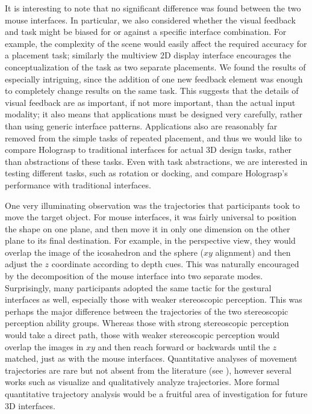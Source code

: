 \documentclass[pageno]{jpaper}
\begin{document}
It is interesting to note that no significant difference was found between the two mouse interfaces. In particular, we also
considered whether the visual feedback and task might be biased for or against a specific interface combination. For example, the
complexity of the scene would easily affect the required accuracy for a placement task; similarly the multiview 2D display interface
encourages the conceptualization of the task as two separate placements. We found the results of \cite{study2} especially intriguing,
since the addition of one new feedback element was enough to completely change results on the same task. This suggests that the details
of visual feedback are as important, if not more important, than the actual input modality; it also means that applications must be
designed very carefully, rather than using generic interface patterns. Applications also are reasonably far removed from the simple tasks
of repeated placement, and thus we would like to compare Holograsp to traditional interfaces for actual 3D design tasks, rather than abstractions
of these tasks. Even with task abstractions, we are interested in testing different tasks, such as rotation or docking, and compare Holograsp's
performance with traditional interfaces.

One very illuminating observation was the trajectories that participants took to move the target object.
For mouse interfaces, it was fairly universal to position the shape on one plane, and then move it in only one dimension on the other
plane to its final destination. For example, in the perspective view, they would overlap the image of the icosahedron and the sphere ($xy$
alignment) and then adjust the $z$ coordinate according to depth cues. This was naturally encouraged by the decomposition of the mouse interface into two separate
modes. Surprisingly, many participants adopted the same tactic for the gestural interfaces as well, especially those with weaker stereoscopic
perception. This was perhaps the major difference between the trajectories of the two stereoscopic perception ability groups. 
Whereas those with strong stereoscopic perception would take a direct path, those with
weaker stereoscopic perception would overlap the images in $xy$ and then reach forward or backwards until the $z$ matched, just as with the mouse
interfaces. Quantitative analyses of movement trajectories are rare but not absent from the literature (see \cite{integralityseparability}), however
several works such as \cite{kruijff2006unconventional} visualize and qualitatively analyze trajectories. More formal quantitative trajectory analysis 
would be a fruitful area of investigation for future 3D interfaces.
\end{document}
